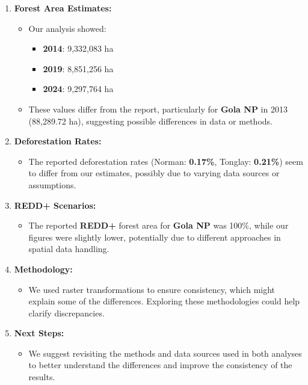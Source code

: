 \documentclass[
]{article}
\providecommand{\tightlist}{%
  \setlength{\itemsep}{0pt}\setlength{\parskip}{0pt}}
\begin{document}
\begin{enumerate}
\def\labelenumi{\arabic{enumi}.}
\item
  \textbf{Forest Area Estimates:}

  \begin{itemize}
  \item
    Our analysis showed:

    \begin{itemize}
    \item
      \textbf{2014}: 9,332,083 ha
    \item
      \textbf{2019}: 8,851,256 ha
    \item
      \textbf{2024}: 9,297,764 ha
    \end{itemize}
  \item
    These values differ from the report, particularly for \textbf{Gola
    NP} in 2013 (88,289.72 ha), suggesting possible differences in data
    or methods.
  \end{itemize}
\item
  \textbf{Deforestation Rates:}

  \begin{itemize}
  \tightlist
  \item
    The reported deforestation rates (Norman: \textbf{0.17\%}, Tonglay:
    \textbf{0.21\%}) seem to differ from our estimates, possibly due to
    varying data sources or assumptions.
  \end{itemize}
\item
  \textbf{REDD+ Scenarios:}

  \begin{itemize}
  \tightlist
  \item
    The reported \textbf{REDD+} forest area for \textbf{Gola NP} was
    100\%, while our figures were slightly lower, potentially due to
    different approaches in spatial data handling.
  \end{itemize}
\item
  \textbf{Methodology:}

  \begin{itemize}
  \tightlist
  \item
    We used raster transformations to ensure consistency, which might
    explain some of the differences. Exploring these methodologies could
    help clarify discrepancies.
  \end{itemize}
\item
  \textbf{Next Steps:}

  \begin{itemize}
  \tightlist
  \item
    We suggest revisiting the methods and data sources used in both
    analyses to better understand the differences and improve the
    consistency of the results.
  \end{itemize}
\end{enumerate}
\end{document}
